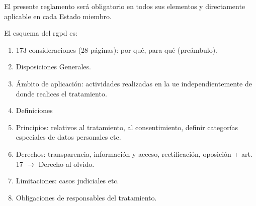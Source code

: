 El presente reglamento será obligatorio en todos sus elementos y directamente aplicable en cada Estado miembro.

El esquema del \gls{rgpd} es:
\begin{enumerate}
    \item 173 consideraciones (28 páginas): por qué, para qué (preámbulo).
    \item Disposiciones Generales.
    \item Ámbito de aplicación: actividades realizadas en la \gls{ue} independientemente de donde realices el tratamiento.
    \item Definiciones
    \item Principios: relativos al tratamiento, al consentimiento, definir categorías especiales de datos personales etc.
    \item Derechos: transparencia, información y acceso, rectificación, oposición + art. 17 $\rightarrow$ Derecho al olvido.
    \item Limitaciones: casos judiciales etc.
    \item Obligaciones de responsables del tratamiento.
\end{enumerate}
